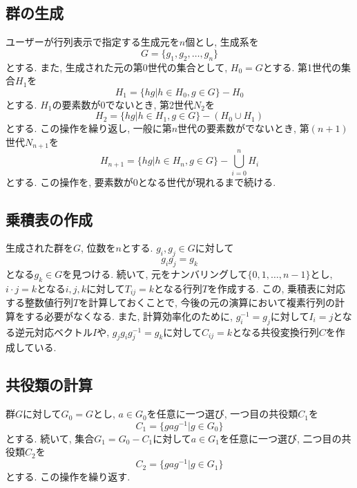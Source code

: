 \documentclass[11pt, a4paper]{jsarticle}
\begin{document}
\subsection{群の生成}
ユーザーが行列表示で指定する生成元を$n$個とし, 生成系を
\begin{equation}
	G = \{g_1, g_2, \dots, g_n \}
\end{equation}
とする.
また, 生成された元の第0世代の集合として, $H_0=G$とする.
第1世代の集合$H_1$を
\begin{equation}
	H_1 = \{ hg | h \in H_0, g \in G\} - H_0
\end{equation}
とする.
$H_1$の要素数が0でないとき, 第2世代$N_2$を
\begin{equation}
	H_2 = \{ hg | h \in H_1, g \in G\} - (H_0 \cup H_1)
\end{equation}
とする.
この操作を繰り返し, 一般に第$n$世代の要素数がでないとき, 第$(n+1)$世代$N_{n+1}$を
\begin{equation}
	H_{n+1} = \{ hg | h \in H_n, g \in G\} - \bigcup_{i=0}^n H_i
\end{equation}
とする.
この操作を, 要素数が0となる世代が現れるまで続ける.

\subsection{乗積表の作成}
生成された群を$G$, 位数を$n$とする.
$g_i,g_j \in G$に対して
\begin{equation}
	g_i g_j = g_k
\end{equation}
となる$g_k \in G$を見つける.
続いて, 元をナンバリングして$\{0,1,\dots,n-1\}$とし, $i \cdot j = k$となる$i,j,k$に対して$T_{ij}=k$となる行列$T$を作成する.
この, 乗積表に対応する整数値行列$T$を計算しておくことで, 今後の元の演算において複素行列の計算をする必要がなくなる.
また, 計算効率化のために, $g_i^{-1}=g_j$に対して$I_i = j$となる逆元対応ベクトル$I$や, $g_jg_ig_j^{-1}=g_k$に対して$C_{ij}=k$となる共役変換行列$C$を作成している.

\subsection{共役類の計算}
群$G$に対して$G_0 = G$とし, $a \in G_0$を任意に一つ選び, 一つ目の共役類$C_1$を
\begin{equation}
	C_1 = \{ g a g^{-1} | g \in G_0\}
\end{equation}
とする.
続いて, 集合$G_1=G_0-C_1$に対して$a \in G_1$を任意に一つ選び, 二つ目の共役類$C_2$を
\begin{equation}
	C_2 = \{ g a g^{-1} | g \in G_1\}
\end{equation}
とする.
この操作を繰り返す.






\end{document}
